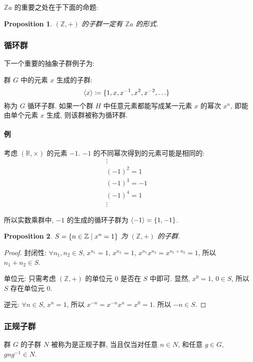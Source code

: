 \documentclass[UTF8]{ctexart}
\theoremstyle{mystyle}
\newtheorem{proposition}{Proposition}[section]
\theoremstyle{myremark}
\theoremstyle{plain}
\newcommand{\R}{\mathbb R}
\newcommand{\Z}{\mathbb Z}
\DeclarePairedDelimiter\set{\{}{\}}
\begin{document}
$ \Z a $ 的重要之处在于下面的命题:
\begin{proposition}
    $ (\Z, +) $ 的子群一定有 $ \Z a $ 的形式.
\end{proposition}

\subsubsection{循环群}
下一个重要的抽象子群例子为:
\begin{definition}
    群 $ G $ 中的元素 $ x $ 生成的子群: 
    \[ \langle x \rangle \coloneqq \set{1, x, x^{-1}, x^2, x^{-2}, \dots} \]
    称为 $ G $ 循环子群. 如果一个群 $ H $ 中任意元素都能写成某一元素 $ x $ 的幂次 $ x^n $, 即能由单个元素 $ x $ 生成, 则该群被称为循环群.
\end{definition}

\paragraph{例}
考虑 $ (\R, \times) $ 的元素 $ -1 $. $ -1 $ 的不同幂次得到的元素可能是相同的:
\[ \begin{array}{c}
    \vdots \\
    (-1)^2 = 1 \\
    (-1)^3 = -1 \\
    (-1)^4 = 1 \\
    \vdots
\end{array} \]

所以实数乘群中, $ -1 $ 的生成的循环子群为 $ \langle -1 \rangle = \set{1, -1} $.


\begin{proposition}
    $ S = \set{n \in \Z \mid x^n = 1} $ 为 $ (\Z, +) $ 的子群.
\end{proposition}

\begin{proof}
    封闭性: $ \forall n_1, n_2 \in S $, $ x^{n_1} = 1 $, $ x^{n_2} = 1 $, $ x^{n_1} x^{n_2} = x^{n_1 + n_2} = 1 $, 所以 $ n_1 + n_2 \in S $.

    单位元: 只需考虑 $ (\Z, +) $ 的单位元 $ 0 $ 是否在 $ S $ 中即可. 显然, $ x^0 = 1 $, $ 0 \in S $, 所以 $ S $ 存在单位元 $ 0 $.

    逆元: $ \forall n \in S $, $ x^n = 1 $, 所以 $ x^{-n} = x^{-n} x^n = x^0 = 1 $. 所以 $ -n \in S $.
\end{proof}

\subsubsection{正规子群}
\begin{definition}
    群 $ G $ 的子群 $ N $ 被称为是正规子群, 当且仅当对任意 $ n \in N $, 和任意 $ g \in G $, $ gng^{-1} \in N $.
\end{definition}
\end{document}
